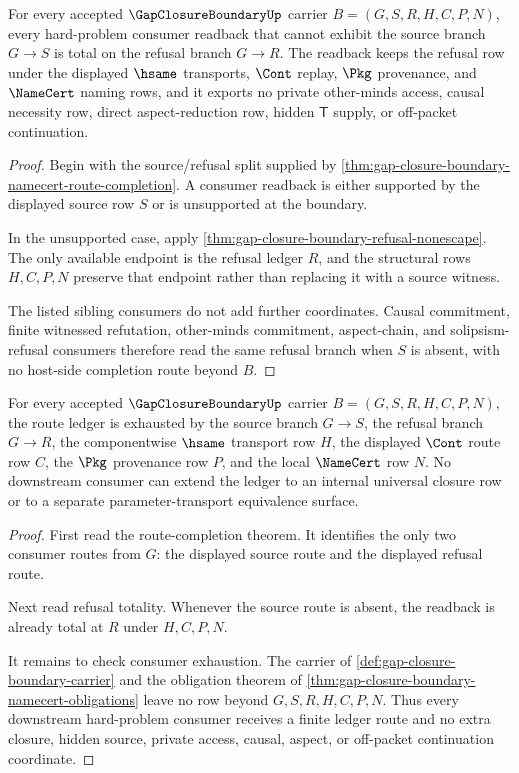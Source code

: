 \begin{theorem}
\label{thm:gap-closure-boundary-refusal-totality-readback}
For every accepted $\GapClosureBoundaryUp$ carrier $B=(G,S,R,H,C,P,N)$, every hard-problem consumer readback that cannot exhibit the source branch $G \longrightarrow S$ is total on the refusal branch $G \longrightarrow R$. The readback keeps the refusal row under the displayed $\hsame$ transports, $\Cont$ replay, $\Pkg$ provenance, and $\NameCert$ naming rows, and it exports no private other-minds access, causal necessity row, direct aspect-reduction row, hidden $\mathsf{T}$ supply, or off-packet continuation.
\end{theorem}
\begin{proof}
Begin with the source/refusal split supplied by \autoref{thm:gap-closure-boundary-namecert-route-completion}. A consumer readback is either supported by the displayed source row $S$ or is unsupported at the boundary.

In the unsupported case, apply \autoref{thm:gap-closure-boundary-refusal-nonescape}. The only available endpoint is the refusal ledger $R$, and the structural rows $H,C,P,N$ preserve that endpoint rather than replacing it with a source witness.

The listed sibling consumers do not add further coordinates. Causal commitment, finite witnessed refutation, other-minds commitment, aspect-chain, and solipsism-refusal consumers therefore read the same refusal branch when $S$ is absent, with no host-side completion route beyond $B$.
\end{proof}

\begin{theorem}
\label{thm:gap-closure-boundary-ledger-exhaustion}
For every accepted $\GapClosureBoundaryUp$ carrier $B=(G,S,R,H,C,P,N)$, the route ledger is exhausted by the source branch $G \longrightarrow S$, the refusal branch $G \longrightarrow R$, the componentwise $\hsame$ transport row $H$, the displayed $\Cont$ route row $C$, the $\Pkg$ provenance row $P$, and the local $\NameCert$ row $N$. No downstream consumer can extend the ledger to an internal universal closure row or to a separate parameter-transport equivalence surface.
\end{theorem}
\begin{proof}
First read the route-completion theorem. It identifies the only two consumer routes from $G$: the displayed source route and the displayed refusal route.

Next read refusal totality. Whenever the source route is absent, the readback is already total at $R$ under $H,C,P,N$.

It remains to check consumer exhaustion. The carrier of \autoref{def:gap-closure-boundary-carrier} and the obligation theorem of \autoref{thm:gap-closure-boundary-namecert-obligations} leave no row beyond $G,S,R,H,C,P,N$. Thus every downstream hard-problem consumer receives a finite ledger route and no extra closure, hidden source, private access, causal, aspect, or off-packet continuation coordinate.
\end{proof}
